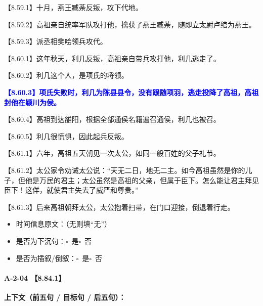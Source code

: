 \documentclass[fontset=none,11pt,a4paper]{ctexart}
\newcommand{\answerline}[1]{\underline{\hspace{#1}}}
\newcommand{\choicebox}[1]{$\square$~#1}
\begin{document}
\noindent 【8.59.1】十月，燕王臧荼反叛，攻下代地。\par
\noindent 【8.59.2】高祖亲自统率军队攻打他，擒获了燕王臧荼，随即立太尉卢绾为燕王。\par
\noindent 【8.59.3】派丞相樊哙领兵攻代。\par
\noindent 【8.60.1】这年秋天，利几反叛，高祖亲自带兵攻打他，利几逃走了。\par
\noindent 【8.60.2】利几这个人，是项氏的将领。\par
\noindent \textcolor{blue}{\textbf{【8.60.3】项氏失败时，利几为陈县县令，没有跟随项羽，逃走投降了高祖，高祖封他在颖川为侯。}}\par
\noindent 【8.60.4】高祖到达雒阳，根据全部通侯名籍遍召通侯，利几也被召。\par
\noindent 【8.60.5】利几很慌惧，因此起兵反叛。\par
\noindent 【8.61.1】六年，高祖五天朝见一次太公，如同一般百姓的父子礼节。\par
\noindent 【8.61.2】太公家令劝诫太公说：“天无二日，地无二主。如今高祖虽然是你的儿子，但他是万民的君主；太公虽然是高祖的父亲，但属于臣下。怎么能让君主拜见臣下！这佯，就使君主失去了威严和尊贵。”\par
\noindent 【8.61.3】后来高祖朝拜太公，太公抱着扫帚，在门口迎接，倒退着行走。\par

\begin{itemize}
  \item 时间信息原文：\answerline{7.5cm}（无则填“无”）
  \item 是否为下沉句：\choicebox{是}\quad \choicebox{否}
  \item 是否为插叙/倒叙：\choicebox{是}\quad \choicebox{否}
\end{itemize}

\paragraph{A-2-04 \quad 【8.84.1】}
\textbf{上下文（前五句 / 目标句 / 后五句）：}
\end{document}
